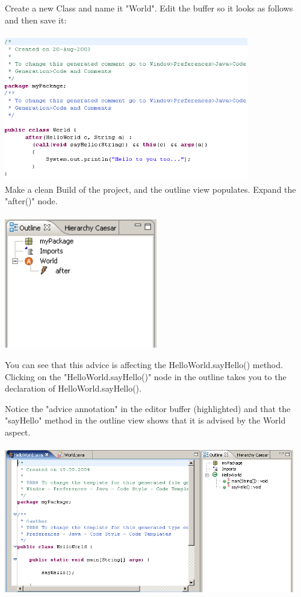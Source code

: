 Create a new Class and name it "World". Edit the buffer so it looks as follows and then save it:\\\\
\includegraphics[width=0.80\textwidth]{images/aspect.png}\\

Make a clean Build of the project, and the outline view populates. Expand the "after()" node.\\\\
\includegraphics[width=0.5\textwidth]{images/aspect2.png}\newpage

You can see that this advice is affecting the HelloWorld.sayHello() method. Clicking on the "HelloWorld.sayHello()" node in the outline takes you to the declaration of HelloWorld.sayHello().

Notice the "advice annotation" in the editor buffer (highlighted) and that the "sayHello" method in the outline view shows that it is advised by the World aspect.\\\\
\includegraphics[width=0.95\textwidth]{images/aspect3.png}\\\\

